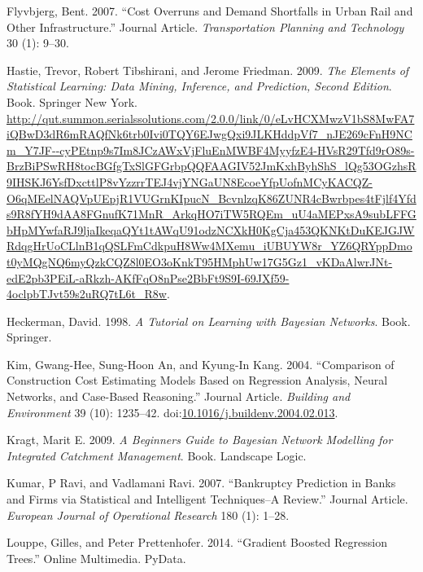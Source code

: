 \documentclass[]{elsarticle} %
\begin{document}
\hypertarget{ref-Flyvbjerg2007}{}
Flyvbjerg, Bent. 2007. ``Cost Overruns and Demand Shortfalls in Urban
Rail and Other Infrastructure.'' Journal Article. \emph{Transportation
Planning and Technology} 30 (1): 9--30.

\hypertarget{ref-Hastie2009}{}
Hastie, Trevor, Robert Tibshirani, and Jerome Friedman. 2009. \emph{The
Elements of Statistical Learning: Data Mining, Inference, and
Prediction, Second Edition}. Book. Springer New York.
\url{http://qut.summon.serialssolutions.com/2.0.0/link/0/eLvHCXMwzV1bS8MwFA7iQBwD3dR6mRAQfNk6trb0Ivi0TQY6EJwgQxi9JLKHddpVf7_nJE269cFnH9NCm_Y7JF--cyPEtnp9s7Im8JCzAWxVjFluEnMWBF4MyyfzE4-HVsR29Tfd9rO89s-BrzBiPSwRH8tocBGfgTxSlGFGrbpQQFAAGIV52JmKxhByhShS_lQg53OGzhsR9IHSKJ6YsfDxcttlP8vYzzrrTEJ4vjYNGaUN8EcoeYfpUofnMCyKACQZ-O6qMEelNAQVpUEpjR1VUGrnKIpucN_BcvnlzqK86ZUNR4cBwrbpes4tFjlf4Yfds9R8fYH9dAA8FGnufK71MnR_ArkqHO7iTW5RQEm_uU4aMEPxsA9subLFFGbHpMYwfaRJ9ljaIkeqaQYt1tAWqU91odzNCXkH0KgCja453QKNKtDuKEJGJWRdqgHrUoCLlnB1qQSLFmCdkpuH8Ww4MXemu_iUBUYW8r_YZ6QRYppDmot0yMQgNQ6myQzkCQZ8l0EO3oKnkT95HMphUw17G5Gz1_vKDaAlwrJNt-edE2pb3PEiL-aRkzh-AKfFqO8nPse2BbFt9S9I-69JXf59-4oclpbTJvt59s2uRQ7tL6t_R8w}.

\hypertarget{ref-Heckerman1998}{}
Heckerman, David. 1998. \emph{A Tutorial on Learning with Bayesian
Networks}. Book. Springer.

\hypertarget{ref-Kim2004}{}
Kim, Gwang-Hee, Sung-Hoon An, and Kyung-In Kang. 2004. ``Comparison of
Construction Cost Estimating Models Based on Regression Analysis, Neural
Networks, and Case-Based Reasoning.'' Journal Article. \emph{Building
and Environment} 39 (10): 1235--42.
doi:\href{https://doi.org/10.1016/j.buildenv.2004.02.013}{10.1016/j.buildenv.2004.02.013}.

\hypertarget{ref-Kragt2009}{}
Kragt, Marit E. 2009. \emph{A Beginners Guide to Bayesian Network
Modelling for Integrated Catchment Management}. Book. Landscape Logic.

\hypertarget{ref-Kumar2007}{}
Kumar, P Ravi, and Vadlamani Ravi. 2007. ``Bankruptcy Prediction in
Banks and Firms via Statistical and Intelligent Techniques--A Review.''
Journal Article. \emph{European Journal of Operational Research} 180
(1): 1--28.

\hypertarget{ref-Louppe2014}{}
Louppe, Gilles, and Peter Prettenhofer. 2014. ``Gradient Boosted
Regression Trees.'' Online Multimedia. PyData.
\end{document}
